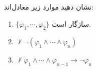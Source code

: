 نشان دهید موارد زیر معادل‌اند:
\begin{enumerate}[label=(\alph*)]
    \item
    $\{\varphi_1,\cdots,\varphi_2\}$
    سازگار است.
    \item $\not\vdash\neg(\varphi_1\wedge\cdots\wedge\varphi_n)$
    \item $\not\vdash\varphi_1\wedge\cdots\wedge\varphi_{n-1}\to\neg\varphi_n$
\end{enumerate}